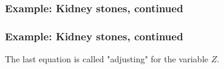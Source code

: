 \documentclass{beamer}
\begin{document}
\begin{frame}
    \frametitle{Example: Kidney stones, continued}
\end{frame}

\begin{frame}
    \frametitle{Example: Kidney stones, continued}
    \begin{flushleft}
        The last equation is called "adjusting" for the variable $Z$.
    \end{flushleft}
\end{frame}
\end{document}
